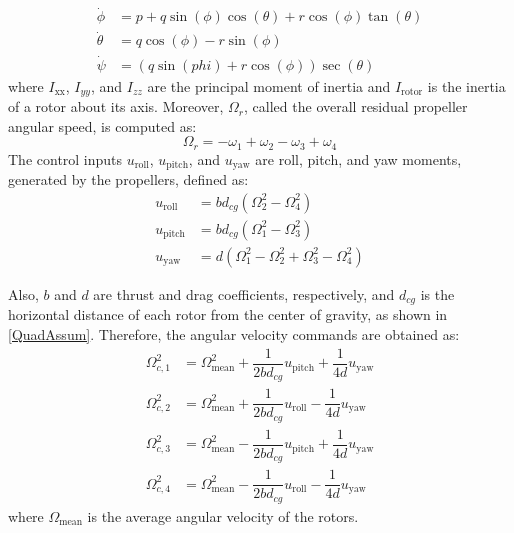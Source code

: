 \documentclass[conference]{IEEEtran}
\begin{document}
\begin{equation}
	\begin{split}
		\dot\phi &= p + q\sin(\phi)\cos(\theta) + r\cos(\phi)\tan(\theta)\\
		\dot \theta &= q\cos(\phi) - r\sin(\phi)\\
		\dot\psi &= (q\sin(phi) + r\cos(\phi))\sec(\theta) 
	\end{split}
\end{equation}
where $I_{\text{xx}}$, $I_{yy}$, and $I_{zz}$ are the principal moment of inertia and $I_{\text{rotor}}$ is the inertia of a rotor about its axis. Moreover, $\Omega_r$, called the overall residual propeller angular speed, is computed as:
\begin{equation}
	\Omega_r = -\omega_1 + \omega_2 - \omega_3 + \omega_4
\end{equation}
The control inputs $u_{\text{roll}}$, $u_{\text{pitch}}$, and $u_{\text{yaw}}$ are roll, pitch, and yaw moments, generated by the propellers, defined as:
\begin{equation}
	\begin{split}
		u_{\text{roll}} &= bd_{cg} (\Omega_2^2 - \Omega_4^2) \\
		u_{\text{pitch}} &= bd_{cg} (\Omega_1^2 - \Omega_3^2) \\
		u_{\text{yaw}} &= d (\Omega_1^2 - \Omega_2^2 + \Omega_3^2 - \Omega_4^2)
	\end{split}
\end{equation}

Also, $b$ and $d$ are thrust and drag coefficients, respectively, and $d_{cg}$ is the horizontal distance of each rotor from the center of gravity, as shown in \figurename{\ref{QuadAssum}}. Therefore, the angular velocity commands are obtained as:
\begin{equation}
	\begin{split}
		\Omega_{c, 1}^2 &= \Omega_{\text{mean}}^2 + \dfrac{1}{2bd_{cg}}u_{\text{pitch}} + \dfrac{1}{4d}u_{\text{yaw}} \\
		\Omega_{c, 2}^2 &= \Omega_{\text{mean}}^2 + \dfrac{1}{2bd_{cg}}u_{\text{roll}} - \dfrac{1}{4d}u_{\text{yaw}} \\
		\Omega_{c, 3}^2 &= \Omega_{\text{mean}}^2 - \dfrac{1}{2bd_{cg}}u_{\text{pitch}} + \dfrac{1}{4d}u_{\text{yaw}} \\
		\Omega_{c, 4}^2 &= \Omega_{\text{mean}}^2 - \dfrac{1}{2bd_{cg}}u_{\text{roll}} - \dfrac{1}{4d}u_{\text{yaw}}
	\end{split}
\end{equation}
where $\Omega_{\text{mean}}$ is the average angular velocity of the rotors.
\end{document}
